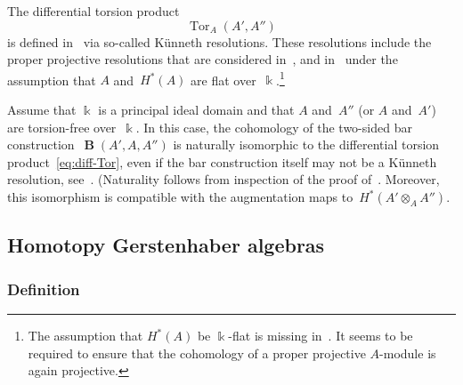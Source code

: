 \documentclass[letterpaper]{amsart}
\numberwithin{equation}{section}
\theoremstyle{plain}
\theoremstyle{definition}
\theoremstyle{remark}
\DeclareMathOperator{\Tor}{Tor}
\DeclareMathOperator{\BB}{\mathbf{B}}
\def\kk{\Bbbk}
\begin{document}
The differential torsion product
\begin{equation}
  \label{eq:diff-Tor}
  \Tor_{A}(A',A'')
\end{equation}
is defined in~\cite[Def.~1.1]{GugenheimMay:1974} via so-called Künneth resolutions.
These resolutions include
the proper projective resolutions that are considered in~\cite[Def.~I.1.1]{Smith:1967},
and in~\cite[Def.~7.5]{McCleary:2001} under the assumption that $A$ and~$H^{*}(A)$ are flat over~$\kk$.\footnote{%
  The assumption that $H^{*}(A)$ be $\kk$-flat is missing in~\cite{Smith:1967}. It seems to be required to ensure
  that the cohomology of a proper projective $A$-module is again projective.}

Assume that $\kk$ is a principal ideal domain and that $A$ and~$A''$ (or $A$ and~$A'$) are torsion-free over~$\kk$.
In this case, the cohomology of the two-sided bar construction~$\BB(A',A,A'')$
is naturally isomorphic to the differential torsion product~\eqref{eq:diff-Tor},
even if the bar construction itself may not be a Künneth resolution, see~\cite[p.~1148]{BarthelMayRiehl:2014}.
(Naturality follows from inspection of the proof of~\cite[Prop.~10.16]{BarthelMayRiehl:2014}.
Moreover, this isomorphism is compatible with the augmentation maps to~$H^{*}(A'\otimes_{A}A'')$.


\subsection{Homotopy Gerstenhaber algebras}
\label{sec:hga}

\subsubsection{Definition}
\end{document}
